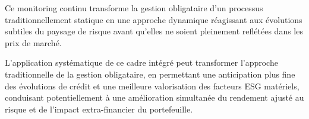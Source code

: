 Ce monitoring continu transforme la gestion obligataire d'un processus traditionnellement statique en une approche dynamique réagissant aux évolutions subtiles du paysage de risque avant qu'elles ne soient pleinement reflétées dans les prix de marché.

L'application systématique de ce cadre intégré peut transformer l'approche traditionnelle de la gestion obligataire, en permettant une anticipation plus fine des évolutions de crédit et une meilleure valorisation des facteurs ESG matériels, conduisant potentiellement à une amélioration simultanée du rendement ajusté au risque et de l'impact extra-financier du portefeuille.